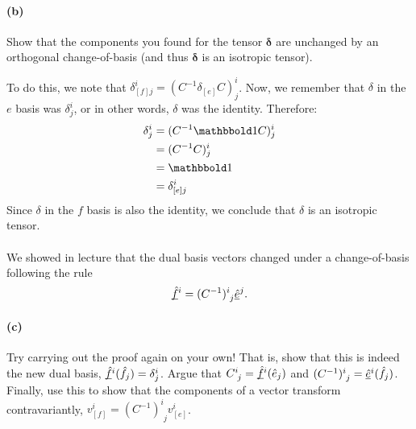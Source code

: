 \documentclass{article}
\newcommand{\basvec}[2]{\hat{#1}_{#2}}							%
\newcommand{\basdual}[2]{\underline{\smash{\hat{#1}}}{}^{#2}}				%
\newcommand{\pascovar}[2]{C^{#1}_{\phantom{#1}#2}}					%
\newcommand{\pascontra}[2]{(C^{-1})^{#1}_{\phantom{#1}#2}}				%
\begin{document}
\paragraph{(b)}
Show that the components you found for the tensor $\boldsymbol{\delta}$ are unchanged by an orthogonal change-of-basis (and thus $\boldsymbol{\delta}$ is an
isotropic tensor).

\begin{solution}
	To do this, we note that $\delta^i_{[f]j} = (C^{-1} \delta_{[e]} C)^i_j$. Now, we remember that $\delta$ 
	in the $e$ basis was $\delta^i_j$, or in other words, $\delta$ was the identity. Therefore:
	\begin{align*}
		\delta^i_j &= (C^{-1} \mathbbold 1 C)^i_j\\
				   &= (C^{-1}C)^i_j \\
				   &= \mathbbold 1 \\
				   &= \delta^i_{[e]j} 
	\end{align*}
	Since $\delta$ in the $f$ basis is also the identity, we conclude that $\delta$ is an isotropic tensor. 
\end{solution}

\phline
\paragraph{}
We showed in lecture that the dual basis vectors changed under a change-of-basis following the rule
	\begin{equation*}
		\basdual{f}{i} = \pascontra{i}{j}\basdual{e}{j}.
	\end{equation*}

\paragraph{(c)}		\extrapart
Try carrying out the proof again on your own!  That is, show that this is indeed the new dual basis, $\basdual{f}{i}(\basvec{f}{j}) = \delta^{i}_{j}$.  Argue that
$\pascovar{i}{j} = \basdual{f}{i}(\basvec{e}{j})$ and $\pascontra{i}{j} = \basdual{e}{i}(\basvec{f}{j})$.  Finally, use this to show that the components of a vector transform
contravariantly, $v^{i}_{[f]} = \pascontra{i}{j}v^{i}_{[e]}$.

\phline
\end{document}
